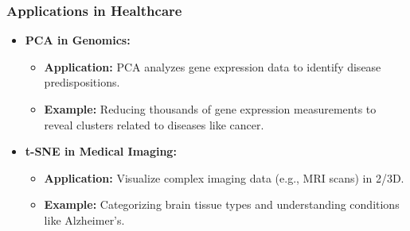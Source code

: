 \documentclass{beamer}
\begin{document}
\begin{frame}[fragile]
    \frametitle{Applications in Healthcare}
    \begin{itemize}
        \item \textbf{PCA in Genomics:}
        \begin{itemize}
            \item \textbf{Application:} PCA analyzes gene expression data to identify disease predispositions.
            \item \textbf{Example:} Reducing thousands of gene expression measurements to reveal clusters related to diseases like cancer.
        \end{itemize}
        
        \item \textbf{t-SNE in Medical Imaging:}
        \begin{itemize}
            \item \textbf{Application:} Visualize complex imaging data (e.g., MRI scans) in 2/3D.
            \item \textbf{Example:} Categorizing brain tissue types and understanding conditions like Alzheimer’s.
        \end{itemize}
    \end{itemize}
\end{frame}
\end{document}
